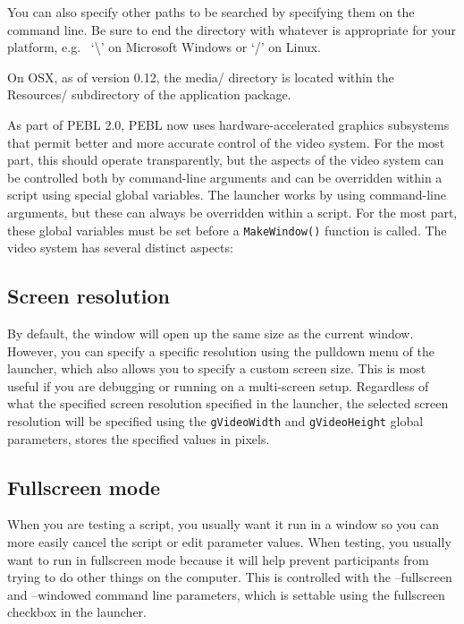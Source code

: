 You can also specify other paths to be searched by specifying them on the command line.  Be sure to end the directory with whatever is appropriate for your platform, e.g.~ `\textbackslash' on Microsoft Windows or `/' on Linux.

On OSX, as of version 0.12, the media/ directory is located within the Resources/ subdirectory of the application package.


As part of PEBL 2.0, PEBL now uses hardware-accelerated graphics subsystems that permit better and more accurate control of the video system.  For the most part, this should operate transparently, but the aspects of the video system can be controlled both by command-line arguments and can be overridden within a script using special global variables.  The launcher works by using command-line arguments, but these can always be overridden within a script.  For the most part, these global variables must be set before a \texttt{MakeWindow()} function is called.  The video system has several distinct aspects: 

\subsection{Screen resolution}  By default, the window will open up the same size as the current window.  However, you can specify a specific resolution using the pulldown menu of the launcher, which also allows you to specify a custom screen size.  This is most useful if you are debugging or running on a multi-screen setup.  Regardless of what the specified screen resolution specified in the launcher, the selected screen resolution will be specified using the \verb|gVideoWidth| and \verb|gVideoHeight| global parameters, stores the specified values in pixels.

\subsection{Fullscreen mode}

When you are testing a script, you usually want it run in a window so you can more easily cancel the script or edit parameter values.  When testing, you usually want to run in fullscreen mode because it will help prevent participants from trying to do other things on the computer.  This is controlled with the --fullscreen and --windowed command line parameters, which is settable using the fullscreen checkbox in the launcher.

